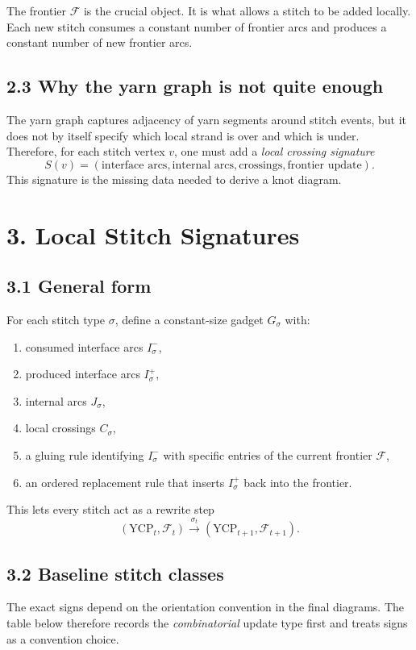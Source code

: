 \documentclass[11pt]{article}
\newcommand{\YCP}{\mathrm{YCP}}
\newcommand{\Front}{\mathcal{F}}
\begin{document}
The frontier \(\Front\) is the crucial object. It is what allows a stitch to be added locally. Each new stitch consumes a constant number of frontier arcs and produces a constant number of new frontier arcs.

\subsection*{2.3 Why the yarn graph is not quite enough}
The yarn graph captures adjacency of yarn segments around stitch events, but it does not by itself specify which local strand is over and which is under. Therefore, for each stitch vertex \(v\), one must add a \emph{local crossing signature}
\[
S(v) = (\text{interface arcs}, \text{internal arcs}, \text{crossings}, \text{frontier update}).
\]
This signature is the missing data needed to derive a knot diagram.

\section*{3. Local Stitch Signatures}

\subsection*{3.1 General form}
For each stitch type \(\sigma\), define a constant-size gadget \(G_\sigma\) with:
\begin{enumerate}[leftmargin=1.5em,itemsep=0.2em]
    \item consumed interface arcs \(I^-_\sigma\),
    \item produced interface arcs \(I^+_\sigma\),
    \item internal arcs \(J_\sigma\),
    \item local crossings \(C_\sigma\),
    \item a gluing rule identifying \(I^-_\sigma\) with specific entries of the current frontier \(\Front\),
    \item an ordered replacement rule that inserts \(I^+_\sigma\) back into the frontier.
\end{enumerate}

This lets every stitch act as a rewrite step
\[
(\YCP_t,\Front_t)\xrightarrow{\sigma_t}(\YCP_{t+1},\Front_{t+1}).
\]

\subsection*{3.2 Baseline stitch classes}
The exact signs depend on the orientation convention in the final diagrams. The table below therefore records the \emph{combinatorial} update type first and treats signs as a convention choice.
\end{document}
